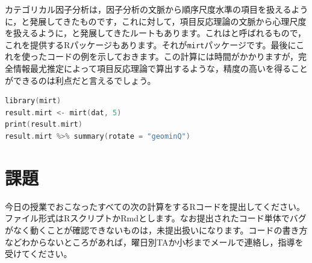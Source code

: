 \documentclass{ltjsbook}
\begin{document}
カテゴリカル因子分析は，因子分析の文脈から順序尺度水準の項目を扱えるように，と発展してきたものです，これに対して，項目反応理論の文脈から心理尺度を扱えるように，と発展してきたルートもあります。これはと呼ばれるもので，これを提供するRパッケージもあります。それが\texttt{mirt}パッケージ\textcite{mirt}です。最後にこれを使ったコードの例を示しておきます。この計算には時間がかかりますが，完全情報最尤推定によって項目反応理論で算出するような，精度の高いを得ることができるのは利点だと言えるでしょう。

\begin{lstlisting}[language=c++,label={code:11_07},caption={mirtの実行}]
library(mirt)
result.mirt <- mirt(dat, 5)
print(result.mirt)
result.mirt %>% summary(rotate = "geominQ")
\end{lstlisting}


\section{課題}
今日の授業でおこなったすべての次の計算をするRコードを提出してください。ファイル形式はRスクリプトかRmdとします。なお提出されたコード単体でバグがなく動くことが確認できないものは，未提出扱いになります。コードの書き方などわからないところがあれば，曜日別TAか小杉までメールで連絡し，指導を受けてください。
\end{document}
